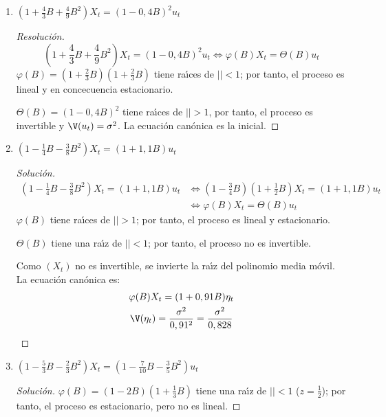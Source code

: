 \begin{ejemplo}
\begin{enumerate}
\item $\left(1+\frac{4}{3}B+\frac{4}{9}B^{2}\right)X_{t} =(1-0,4B)^{2}u_{t} $

\begin{proof}[Resoluci\'{o}n]

\[
\left(1+\frac{4}{3}B+\frac{4}{9}B^{2}\right)X_{t} =(1-0,4B)^{2}u_{t} 
\Longleftrightarrow \varphi (B)X_{t} =\Theta (B)u_{t} 
\]
$\varphi (B)=\left(1+\frac{2}{3}B\right)\left(1+\frac{2}{3}B\right)$ tiene ra\'{\i}ces de $\left| 
\right|< 1$; por tanto, el proceso es lineal y en concecuencia 
estacionario.

$\Theta (B)=(1-0,4B)^{2}$ tiene ra\'{\i}ces de $\left| \right|> 1$, 
por tanto, el proceso es invertible y $\V(u_{t} )=\sigma^{2}$. La 
ecuaci\'{o}n can\'{o}nica es la inicial. 
\end{proof}



\item $\left(1-\frac{1}{4}B-\frac{3}{8}B^{2}\right)X_{t} =(1+1,1B)u_{t} $ 
\begin{proof}[Soluci\'{o}n]
\begin{align*}
\left(1-\frac{1}{4}B-\frac{3}{8}B^{2}\right)X_{t} =(1+1,1B)u_{t}
	& \Leftrightarrow \left(1-\frac{3}{4}B\right)\left(1+\frac{1}{2}B\right)X_{t} =(1+1,1B)u_{t}\\
	& \Leftrightarrow \varphi(B)X_{t} =\Theta (B)u_{t} 
\end{align*}
$\varphi (B)$ tiene ra\'{\i}ces de $\left| \right|> 1$; por tanto, 
el proceso es lineal y estacionario.

$\Theta (B)$ tiene una ra\'{\i}z de $\left| \right|< 1$; por tanto, 
el proceso no es invertible.

Como $(X_{t} )$ no es invertible, se invierte la ra\'{\i}z del polinomio 
media m\'{o}vil. La ecuaci\'{o}n can\'{o}nica es:
\begin{gather*}
\varphi (B)X_{t} =(1+0,91B)\eta_{t} 
\\
\V(\eta_{t} )=\frac{\sigma^{2}}{0,91^{2}}=\frac{\sigma^{2}}{0,828}
\end{gather*}
\end{proof}


\item $\left(1-\frac{5}{3}B-\frac{2}{3}B^{2}\right)X_{t} =\left(1-\frac{7}{10}B-\frac{3}{5}B^{2}\right)u_{t} $ 
\begin{proof}[Soluci\'{o}n]
$\varphi (B)=(1-2B)(1+\frac{1}{3}B)$ tiene una ra\'{\i}z de $\left| 
\right|< 1$ ($z=\frac{1}{2}$); por tanto, el proceso es 
estacionario, pero no es lineal.


\end{proof}
\end{enumerate}
\end{ejemplo}

